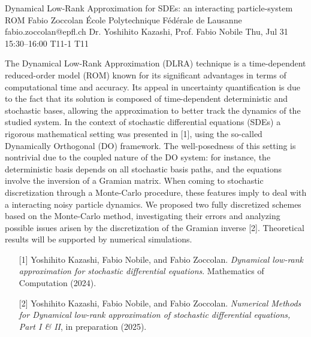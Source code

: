 \begin{talk}
  {Dynamical Low-Rank Approximation for SDEs: an interacting particle-system ROM}%
  {Fabio Zoccolan}%
  {École Polytechnique Fédérale de Lausanne}%
  {fabio.zoccolan@epfl.ch}%
  {Dr. Yoshihito Kazashi, Prof. Fabio Nobile}%
  {}%
  {Thu, Jul 31 15:30–16:00}%
  {T11-1}%
  {T11}%
  
The Dynamical Low-Rank Approximation (DLRA) technique is a time-dependent reduced-order model (ROM) known for its significant advantages in terms of computational time and accuracy. Its appeal in uncertainty quantification is due to the fact that its solution is composed of time-dependent deterministic and stochastic bases, allowing the approximation to better track the dynamics of the studied system. In the context of stochastic differential equations (SDEs) a rigorous mathematical setting was presented in [1], using the so-called Dynamically Orthogonal (DO) framework. The well-posedness of this setting is nontrivial due to the coupled nature of the DO system: for instance, the deterministic basis depends on all stochastic basis paths, and the equations involve the inversion of a Gramian matrix. When coming to stochastic discretization through a Monte-Carlo procedure, these features imply to deal with a interacting noisy particle dynamics. We proposed two fully discretized schemes based on the Monte-Carlo method, investigating their errors and analyzing possible issues arisen by the discretization of the Gramian inverse [2]. Theoretical results will be supported by numerical simulations.

\medskip
\begin{enumerate}
	\item[{[1]}] Yoshihito Kazashi, Fabio Nobile, and Fabio Zoccolan. {\it Dynamical low-rank approximation for stochastic differential equations}. Mathematics of Computation (2024).
	\item[{[2]}] Yoshihito Kazashi, Fabio Nobile, and Fabio Zoccolan. {\it Numerical Methods for Dynamical low-rank approximation of stochastic differential equations, Part I \& II}, in preparation (2025).
\end{enumerate}

\end{talk}

